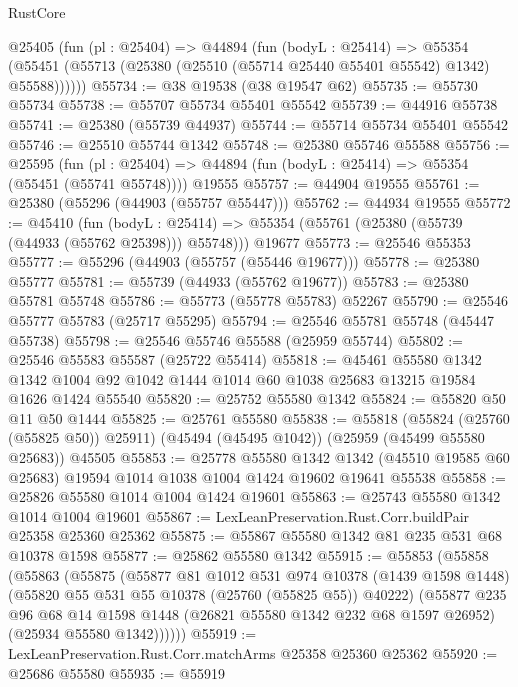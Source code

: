 \begin{lexlean}{RustCore}
\begin{coremodule}
    @25405
      (fun (pl : @25404) =>
      @44894
        (fun (bodyL : @25414) =>
        @55354 (@55451 (@55713 (@25380 (@25510 (@55714 @25440 @55401 @55542) @1342) @55588))))))
@55734 := @38 @19538 (@38 @19547 @62)
@55735 := @55730 @55734
@55738 := @55707 @55734 @55401 @55542
@55739 := @44916 @55738
@55741 := @25380 (@55739 @44937)
@55744 := @55714 @55734 @55401 @55542
@55746 := @25510 @55744 @1342
@55748 := @25380 @55746 @55588
@55756 := @25595
    (fun (pl : @25404) => @44894 (fun (bodyL : @25414) => @55354 (@55451 (@55741 @55748))))
    @19555
@55757 := @44904 @19555
@55761 := @25380 (@55296 (@44903 (@55757 @55447)))
@55762 := @44934 @19555
@55772 := @45410
    (fun (bodyL : @25414) => @55354 (@55761 (@25380 (@55739 (@44933 (@55762 @25398))) @55748)))
    @19677
@55773 := @25546 @55353
@55777 := @55296 (@44903 (@55757 (@55446 @19677)))
@55778 := @25380 @55777
@55781 := @55739 (@44933 (@55762 @19677))
@55783 := @25380 @55781 @55748
@55786 := @55773 (@55778 @55783) @52267
@55790 := @25546 @55777 @55783 (@25717 @55295)
@55794 := @25546 @55781 @55748 (@45447 @55738)
@55798 := @25546 @55746 @55588 (@25959 @55744)
@55802 := @25546 @55583 @55587 (@25722 @55414)
@55818 := @45461
    @55580
    @1342
    @1342
    @1004
    @92
    @1042
    @1444
    @1014
    @60
    @1038
    @25683
    @13215
    @19584
    @1626
    @1424
    @55540
@55820 := @25752 @55580 @1342
@55824 := @55820 @50 @11 @50 @1444
@55825 := @25761 @55580
@55838 := @55818
    (@55824 (@25760 (@55825 @50)) @25911)
    (@45494 (@45495 @1042))
    (@25959 (@45499 @55580 @25683))
    @45505
@55853 := @25778
    @55580
    @1342
    @1342
    (@45510 @19585 @60 @25683)
    @19594
    @1014
    @1038
    @1004
    @1424
    @19602
    @19641
    @55538
@55858 := @25826 @55580 @1014 @1004 @1424 @19601
@55863 := @25743 @55580 @1342 @1014 @1004 @19601
@55867 := LexLeanPreservation.Rust.Corr.buildPair @25358 @25360 @25362
@55875 := @55867 @55580 @1342 @81 @235 @531 @68 @10378 @1598
@55877 := @25862 @55580 @1342
@55915 := @55853
    (@55858
      (@55863
        (@55875
          (@55877
            @81
            @1012
            @531
            @974
            @10378
            (@1439 @1598 @1448)
            (@55820 @55 @531 @55 @10378 (@25760 (@55825 @55)) @40222)
            (@55877
              @235
              @96
              @68
              @14
              @1598
              @1448
              (@26821 @55580 @1342 @232 @68 @1597 @26952)
              (@25934 @55580 @1342))))))
@55919 := LexLeanPreservation.Rust.Corr.matchArms @25358 @25360 @25362
@55920 := @25686 @55580
@55935 := @55919

\end{coremodule}
\end{lexlean}
